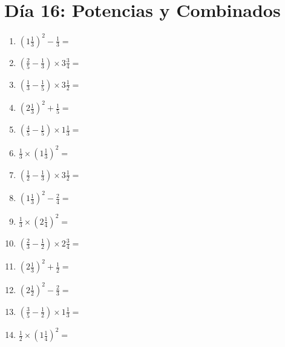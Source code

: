 \documentclass[12pt]{article}
\begin{document}
\section*{Día 16: Potencias y Combinados}
\begin{enumerate}
\item \large $ \left( 1 \frac{1}{3} \right)^2 - \frac{1}{3} = $ \vspace{1.6cm}
\item \large $ \left( \frac{2}{5} - \frac{1}{3} \right) \times 3 \frac{3}{4} = $ \vspace{1.6cm}
\item \large $ \left( \frac{1}{3} - \frac{1}{5} \right) \times 3 \frac{1}{2} = $ \vspace{1.6cm}
\item \large $ \left( 2 \frac{1}{3} \right)^2 + \frac{1}{5} = $ \vspace{1.6cm}
\item \large $ \left( \frac{4}{5} - \frac{1}{5} \right) \times 1 \frac{1}{3} = $ \vspace{1.6cm}
\item \large $ \frac{1}{3} \times \left( 1 \frac{1}{3} \right)^2 = $ \vspace{1.6cm}
\item \large $ \left( \frac{1}{2} - \frac{1}{3} \right) \times 3 \frac{1}{2} = $ \vspace{1.6cm}
\item \large $ \left( 1 \frac{1}{3} \right)^2 - \frac{2}{4} = $ \vspace{1.6cm}
\item \large $ \frac{1}{3} \times \left( 2 \frac{1}{4} \right)^2 = $ \vspace{1.6cm}
\item \large $ \left( \frac{2}{3} - \frac{1}{2} \right) \times 2 \frac{3}{4} = $ \vspace{1.6cm}
\newpage
\item \large $ \left( 2 \frac{1}{3} \right)^2 + \frac{1}{2} = $ \vspace{1.6cm}
\item \large $ \left( 2 \frac{1}{2} \right)^2 - \frac{2}{3} = $ \vspace{1.6cm}
\item \large $ \left( \frac{3}{5} - \frac{1}{2} \right) \times 1 \frac{1}{3} = $ \vspace{1.6cm}
\item \large $ \frac{1}{2} \times \left( 1 \frac{1}{4} \right)^2 = $ \vspace{1.6cm}

\end{enumerate}
\end{document}
